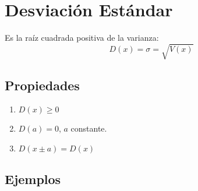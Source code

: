 \section{Desviación Estándar}
Es la raíz cuadrada positiva de la varianza:
$$D(x)=\sigma = \sqrt{V(x)}$$
\subsection{Propiedades}
\begin{enumerate}
\item $D(x) \geq 0$
\item $D(a)=0$, $a$ constante.
\item $D(x\pm a)=D(x)$
\end{enumerate}
\subsection{Ejemplos}